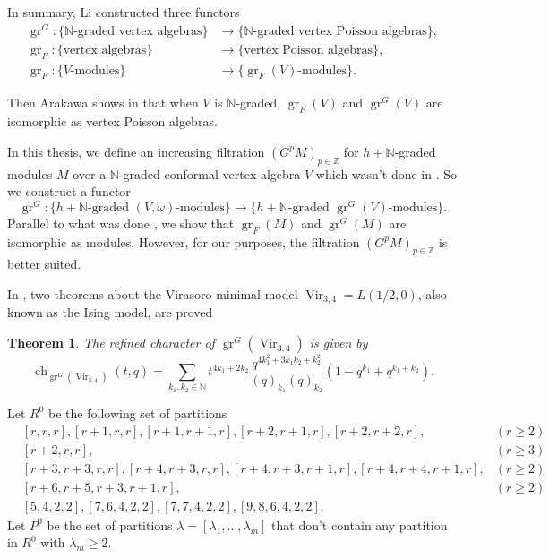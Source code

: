 \documentclass[a4paper, 12pt, reqno]{amsart}
\newtheorem{theorem}{Theorem}[section]
\theoremstyle{remark}
\numberwithin{equation}{subsection}
\DeclareMathOperator{\Vir}{Vir}
\DeclareMathOperator{\gr}{gr}
\DeclareMathOperator{\ch}{ch}
\begin{document}
In summary, Li constructed three functors
\begin{align*}
  \gr^G: \{\text{$\mathbb{N}$-graded vertex algebras}\} &\to \{\text{$\mathbb{N}$-graded vertex Poisson algebras}\}, \\
  \gr_F: \{\text{vertex algebras}\} &\to \{\text{vertex Poisson algebras}\}, \\
  \gr_F: \{\text{$V$-modules}\} &\to \{\text{$\gr_F(V)$-modules}\}.
\end{align*}

Then Arakawa shows in \cite[Proposition 2.6.1]{arakawa_remark_2012} that when $V$ is $\mathbb{N}$-graded, $\gr_F(V)$ and $\gr^G(V)$ are isomorphic as vertex Poisson algebras.

In this thesis, we define an increasing filtration $(G^pM)_{p \in \mathbb{Z}}$ for $h + \mathbb{N}$-graded modules $M$ over a $\mathbb{N}$-graded conformal vertex algebra $V$ which wasn't done in \cite{li_vertex_2004}.
So we construct a functor
\begin{equation*}
  \gr^G: \{\text{$h + \mathbb{N}$-graded $(V, \omega)$-modules}\} \to \{\text{$h + \mathbb{N}$-graded $\gr^G(V)$-modules}\}.
\end{equation*}
Parallel to what was done \cite{arakawa_remark_2012}, we show that $\gr_F(M)$ and $\gr^G(M)$ are isomorphic as modules.
However, for our purposes, the filtration $(G^pM)_{p \in \mathbb{Z}}$ is better suited.

In \cite{andrews_singular_2022}, two theorems about the Virasoro minimal model $\Vir_{3, 4} = L(1/2, 0)$, also known as the Ising model, are proved

\begin{theorem}
  \label{thr:1}
  The refined character of $\gr^G(\Vir_{3,4})$ is given by
  \begin{equation*}
    \ch_{\gr^G(\Vir_{3, 4})}(t, q) = \sum_{k_1, k_2 \in \mathbb{N}}t^{4k_1 + 2k_2}\frac{q^{4k_1^2 + 3k_1k_2 + k_2^2}}{(q)_{k_1}(q)_{k_2}}(1 - q^{k_1} + q^{k_1 + k_2}).
  \end{equation*}
\end{theorem}

Let $R^0$ be the following set of partitions
\begin{align*}
  &[r, r, r], [r + 1, r, r], [r + 1, r + 1, r], [r + 2, r + 1, r], [r + 2, r + 2, r], &(r \ge 2) \\
  &[r + 2, r, r], &(r \ge 3) \\
  &[r + 3, r + 3, r, r], [r + 4, r + 3, r, r],  [r + 4, r + 3, r + 1, r], [r + 4, r + 4, r + 1, r], &(r \ge 2) \\
  &[r + 6, r + 5, r + 3, r + 1, r], &(r \ge 2) \\
  &[5, 4, 2, 2], [7, 6, 4, 2, 2], [7, 7, 4, 2, 2], [9, 8, 6, 4, 2, 2].
\end{align*}
Let $P^0$ be the set of partitions $\lambda = [\lambda_1, \dots, \lambda_m]$ that don't contain any partition in $R^0$ with $\lambda_m \ge 2$.
\end{document}
